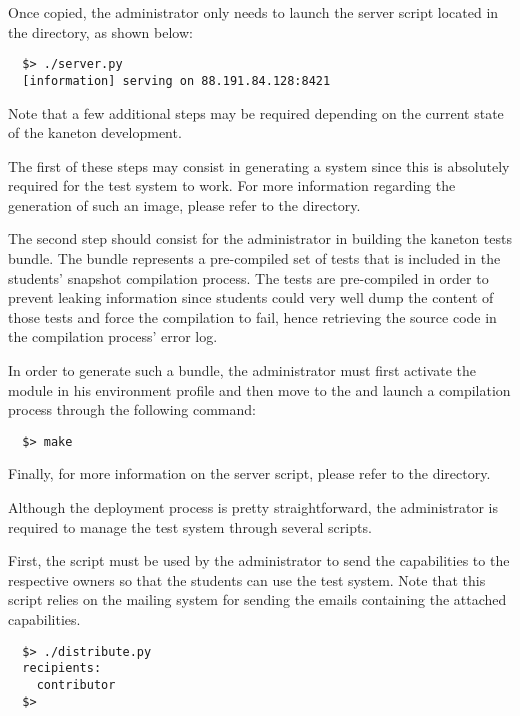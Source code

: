 Once copied, the administrator only needs to launch the server script located
in the  directory, as shown below:

\begin{verbatim}
  $> ./server.py
  [information] serving on 88.191.84.128:8421
\end{verbatim}

Note that a few additional steps may be required depending on the current state
of the kaneton development.

The first of these steps may consist in generating a  system
since this is absolutely required for the test system to work. For more
information regarding the generation of such an image, please refer to the
 directory.

The second step should consist for the administrator in building the kaneton
tests bundle. The bundle represents a pre-compiled set of tests that is
included in the students' snapshot compilation process. The tests are
pre-compiled in order to prevent leaking information since students could
very well dump the content of those tests and force the compilation to fail,
hence retrieving the source code in the compilation process' error log.

In order to generate such a bundle, the administrator must first activate
the  module in his environment profile and then move to the
 and launch a compilation process through the following
command:

\begin{verbatim}
  $> make
\end{verbatim}

Finally, for more information on the server script, please refer to the
 directory.


Although the deployment process is pretty straightforward, the administrator
is required to manage the test system through several scripts.

First, the  script must be used by the administrator to send
the capabilities to the respective owners so that the students can use
the test system. Note that this script relies on the  mailing
system for sending the emails containing the attached capabilities.

\begin{verbatim}
  $> ./distribute.py
  recipients:
    contributor
  $>
\end{verbatim}

